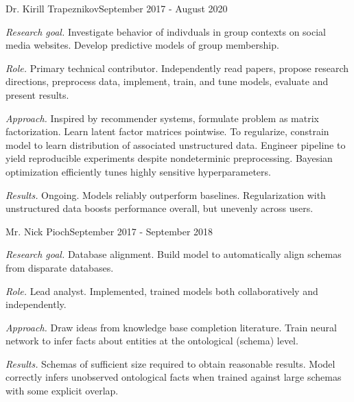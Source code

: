 \documentclass[10pt]{article}
\begin{document}
		{Dr. Kirill Trapeznikov}{September 2017 - August 2020}
		{\begin{itemize-noindent}
			\item{\textit{Research goal.} Investigate behavior of indivduals in group contexts on social media websites. Develop predictive models of group membership.}
			\item{\textit{Role.} Primary technical contributor. Independently read papers, propose research directions, preprocess data, implement, train, and tune models, evaluate and present results.}
			\item{\textit{Approach.} Inspired by recommender systems, formulate problem as matrix factorization. Learn latent factor matrices pointwise. To regularize, constrain model to learn distribution of associated unstructured data. Engineer pipeline to yield reproducible experiments despite nondeterminic preprocessing. Bayesian optimization efficiently tunes highly sensitive hyperparameters.}
			\item{\textit{Results.} Ongoing. Models reliably outperform baselines. Regularization with unstructured data boosts performance overall, but unevenly across users. }
		\end{itemize-noindent}}

		{Mr. Nick Pioch}{September 2017 - September 2018}
		{\begin{itemize-noindent}
			\item{\textit{Research goal.} Database alignment. Build model to automatically align schemas from disparate databases.}
			\item{\textit{Role.} Lead analyst. Implemented, trained models both collaboratively and independently.}
			\item{\textit{Approach.} Draw ideas from knowledge base completion literature. Train neural network to infer facts about entities at the ontological (schema) level.}
			\item{\textit{Results.} Schemas of sufficient size required to obtain reasonable results. Model correctly infers unobserved ontological facts when trained against large schemas with some explicit overlap.}
		\end{itemize-noindent}}
\end{document}
